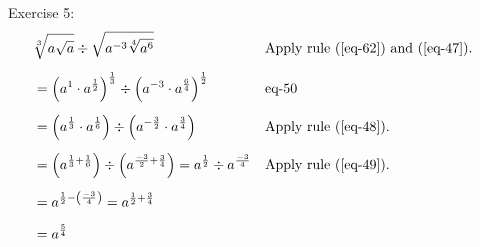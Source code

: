 Exercise 5:
\begin{align*}
    &\sqrt[3]{a\sqrt{a}} \div \sqrt{a^{-3}\sqrt[4]{a^6}} &&\text{Apply rule \bref{eq-62} and \bref{eq-47}.}&\\[1.25ex]
    &= \left(a^1 \cdot a^{\frac{1}{2}}\right)^{\frac{1}{3}} \div \left(a^{-3} \cdot a^{\frac{6}{4}}\right)^{\frac{1}{2}}&&\text{eq-50}&\\[1.25ex]
    &= \left(a^{\frac{1}{3}} \cdot a^{\frac{1}{6}}\right) \div \left(a^{-\frac{3}{2}} \cdot a^{\frac{3}{4}}\right)&&\text{Apply rule \bref{eq-48}.}&\\[1.25ex]
    &= \left(a^{\frac{1}{3}+\frac{1}{6}}\right) \div \left(a^{\frac{-3}{2}+\frac{3}{4}}\right) = a^{\frac{1}{2}} \div a^{\frac{-3}{4}}&&\text{Apply rule \bref{eq-49}.}&\\[1.25ex]
    &= a^{\frac{1}{2}-\left(\frac{-3}{4}\right)} = a^{\frac{1}{2} + \frac{3}{4}}&\\[1.25ex]
    &= a^{\frac{5}{4}}
\end{align*}
